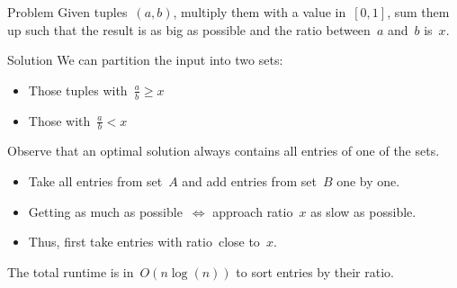 \begin{slide}
	\begin{block}{Problem}
		Given tuples~$(a, b)$, multiply them with a value in~$[0,1]$, sum them up such that the result is as big as possible and the ratio between~$a$ and~$b$ is~$x$.
	\end{block}
	\pause
	\begin{block}{Solution}
		We can partition the input into two sets:
		\begin{itemize}
			\item Those tuples with~$\frac{a}{b}\ge x$
			\item Those with~$\frac{a}{b}<x$
		\end{itemize}
		Observe that an optimal solution always contains all entries of one of the sets.
		\begin{itemize}
			\item Take all entries from set~$A$ and add entries from set~$B$ one by one.
			\item Getting as much as possible~$\iff$ approach ratio~$x$ as slow as possible.
			\item Thus, first take entries with ratio~close to~$x$.
		\end{itemize}
		The total runtime is in~$O(n\log(n))$ to sort entries by their ratio.
	\end{block}
\end{slide}
